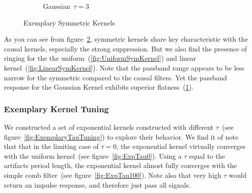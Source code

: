 \documentclass[a4paper]{article}
\newcommand{\figref}[1]{(see figure~\ref{#1})}
\begin{document}
\begin{figure}[hbtp]
\begin{subfigure}{.245\textwidth}
        \caption{Gaussian~$\tau=3$}\label{fig:GaussSymKernel}
    \end{subfigure}
    \caption{Exemplary Symmetric Kernels}\label{fig:ExemplarySymKernels}
\end{figure}

As you can see from figure~\ref{fig:ExemplarySymKernels}, symmetric kernels share key characteristic with the causal kernels, especially the strong suppression. But we also find the presence of ringing for the the uniform~(\ref{fig:UniformSymKernel}) and linear kernel~(\ref{fig:LinearSymKernel}). Note that the passband range appears to be  less narrow for the symmetric compared to the causal filters. Yet the passband response for the Gaussian Kernel exhibits  superior flatness~(\ref{fig:GaussSymKernel}).

\subsubsection{Exemplary Kernel Tuning}

We constructed a set of exponential kernels constructed with different $\tau$~\figref{fig:ExemplaryTauTuning} to explore their behavior.
We find it of note that that in the limiting case of $\tau = 0$, the exponential kernel virtually converges with the uniform kernel~\figref{fig:ExpTau0}. Using a $\tau$ equal to the artifacts period length, the exponential kernel almost fully converges with the simple comb filter~\figref{fig:ExpTau100}.
Note also that very high $\tau$ would return an impulse response, and therefore just pass all signals.
\end{document}
